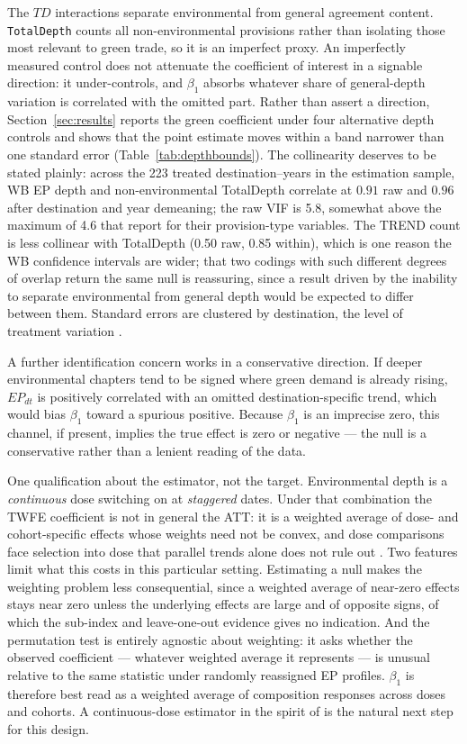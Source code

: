 \documentclass[12pt]{article}
\begin{document}
The $TD$ interactions separate environmental from general agreement content.
\texttt{TotalDepth} counts all non-environmental provisions rather than isolating those
most relevant to green trade, so it is an imperfect proxy. An imperfectly measured
control does not attenuate the coefficient of interest in a signable direction: it
under-controls, and $\beta_1$ absorbs whatever share of general-depth variation is
correlated with the omitted part. Rather than assert a direction, Section~\ref{sec:results}
reports the green coefficient under four alternative depth controls and shows that the
point estimate moves within a band narrower than one standard error
(Table~\ref{tab:depthbounds}). The collinearity deserves to be stated plainly: across
the 223 treated destination--years in the estimation sample, WB EP depth and
non-environmental TotalDepth correlate at $0.91$ raw and $0.96$ after destination and
year demeaning; the raw VIF is 5.8, somewhat above the maximum of 4.6 that
\citet{brandi2020} report for their provision-type variables. The TREND count is less
collinear with TotalDepth (0.50 raw, 0.85 within), which is one reason the WB confidence
intervals are wider; that two codings with such different degrees of overlap return the
same null is reassuring, since a result driven by the inability to separate environmental
from general depth would be expected to differ between them. Standard errors are clustered
by destination, the level of treatment variation \citep{abadie2023}.

A further identification concern works in a conservative direction. If deeper environmental
chapters tend to be signed where green demand is already rising, $EP_{dt}$ is positively
correlated with an omitted destination-specific trend, which would bias $\beta_1$ toward
a spurious positive. Because $\beta_1$ is an imprecise zero, this channel, if present,
implies the true effect is zero or negative --- the null is a conservative rather than a
lenient reading of the data.

One qualification about the estimator, not the target. Environmental depth is a
\emph{continuous} dose switching on at \emph{staggered} dates. Under that combination the
TWFE coefficient is not in general the ATT: it is a weighted average of dose- and
cohort-specific effects whose weights need not be convex, and dose comparisons face
selection into dose that parallel trends alone does not rule out
\citep{callaway2024, goodmanbacon2021, dechaisemartin2020}. Two features limit what this
costs in this particular setting. Estimating a null makes the weighting problem less
consequential, since a weighted average of near-zero effects stays near zero unless the
underlying effects are large and of opposite signs, of which the sub-index and
leave-one-out evidence gives no indication. And the permutation test is entirely
agnostic about weighting: it asks whether the observed coefficient --- whatever weighted
average it represents --- is unusual relative to the same statistic under randomly
reassigned EP profiles. $\beta_1$ is therefore best read as a weighted average of
composition responses across doses and cohorts. A continuous-dose estimator in the spirit
of \citet{callaway2024} is the natural next step for this design.
\end{document}

